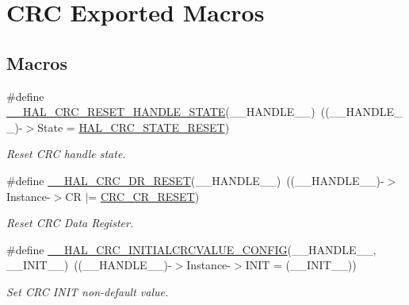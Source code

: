 \hypertarget{group___c_r_c___exported___macros}{}\section{C\+RC Exported Macros}
\label{group___c_r_c___exported___macros}
\subsection*{Macros}
\begin{DoxyCompactItemize}
\item 
\#define \hyperlink{group___c_r_c___exported___macros_gab6ec5d74fdff177143f4b22652a18114}{\+\_\+\+\_\+\+H\+A\+L\+\_\+\+C\+R\+C\+\_\+\+R\+E\+S\+E\+T\+\_\+\+H\+A\+N\+D\+L\+E\+\_\+\+S\+T\+A\+TE}(\+\_\+\+\_\+\+H\+A\+N\+D\+L\+E\+\_\+\+\_\+)~((\+\_\+\+\_\+\+H\+A\+N\+D\+L\+E\+\_\+\+\_\+)-\/$>$State = \hyperlink{group___c_r_c___exported___types_gga1021d6f27a072d45f6f3b233eefd8bbea313bbe8353f8a8b48fbd129261266a97}{H\+A\+L\+\_\+\+C\+R\+C\+\_\+\+S\+T\+A\+T\+E\+\_\+\+R\+E\+S\+ET})
\begin{DoxyCompactList}\small\item\em Reset C\+RC handle state. \end{DoxyCompactList}\item 
\#define \hyperlink{group___c_r_c___exported___macros_ga0007a05fb01806007181e12eedc14d28}{\+\_\+\+\_\+\+H\+A\+L\+\_\+\+C\+R\+C\+\_\+\+D\+R\+\_\+\+R\+E\+S\+ET}(\+\_\+\+\_\+\+H\+A\+N\+D\+L\+E\+\_\+\+\_\+)~((\+\_\+\+\_\+\+H\+A\+N\+D\+L\+E\+\_\+\+\_\+)-\/$>$Instance-\/$>$CR $\vert$= \hyperlink{group___peripheral___registers___bits___definition_ga7d57481fb891a0964b40f721354c56d7}{C\+R\+C\+\_\+\+C\+R\+\_\+\+R\+E\+S\+ET})
\begin{DoxyCompactList}\small\item\em Reset C\+RC Data Register. \end{DoxyCompactList}\item 
\#define \hyperlink{group___c_r_c___exported___macros_ga0e7d2216d91b03ed4ddae8ab3ce5aa76}{\+\_\+\+\_\+\+H\+A\+L\+\_\+\+C\+R\+C\+\_\+\+I\+N\+I\+T\+I\+A\+L\+C\+R\+C\+V\+A\+L\+U\+E\+\_\+\+C\+O\+N\+F\+IG}(\+\_\+\+\_\+\+H\+A\+N\+D\+L\+E\+\_\+\+\_\+,  \+\_\+\+\_\+\+I\+N\+I\+T\+\_\+\+\_\+)~((\+\_\+\+\_\+\+H\+A\+N\+D\+L\+E\+\_\+\+\_\+)-\/$>$Instance-\/$>$I\+N\+IT = (\+\_\+\+\_\+\+I\+N\+I\+T\+\_\+\+\_\+))
\begin{DoxyCompactList}\small\item\em Set C\+RC I\+N\+IT non-\/default value. \end{DoxyCompactList}\item 

\end{DoxyCompactItemize}
